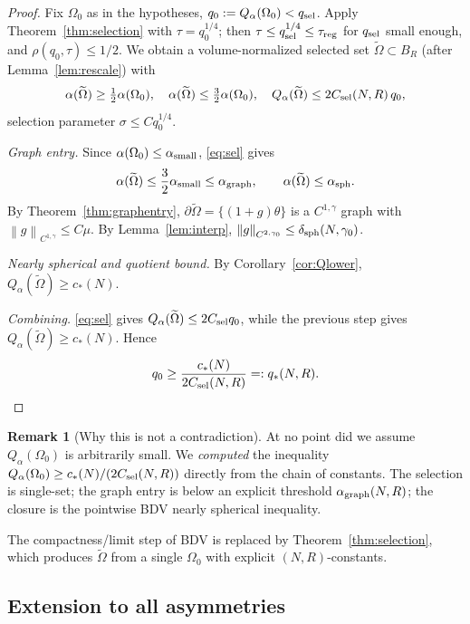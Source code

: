 \documentclass[11pt]{article}
\theoremstyle{definition}
\newtheorem{remark}[theorem]{Remark}
\newcommand{\norm}[1]{\left\|#1\right\|}
\begin{document}
\begin{proof}
Fix $\Omega_0$ as in the hypotheses, $q_0:=Q_\alpha(\Omega_0)<q_{\rm sel}$.
Apply Theorem~\ref{thm:selection} with $\tau=q_0^{1/4}$; then
$\tau\le q_{\rm sel}^{1/4}\le\tau_{\rm reg}$ for $q_{\rm sel}$ small enough,
and $\rho(q_0,\tau)\le1/2$. We obtain a volume-normalized selected set
$\widetilde\Omega\subset B_R$ (after Lemma~\ref{lem:rescale}) with
\begin{equation}\label{eq:sel}
\alpha(\widetilde\Omega)\ge\tfrac12\alpha(\Omega_0),
\quad
\alpha(\widetilde\Omega)\le\tfrac32\alpha(\Omega_0),
\quad
Q_\alpha(\widetilde\Omega)\le 2C_{\rm sel}(N,R)\,q_0,
\end{equation}
selection parameter $\sigma\le Cq_0^{1/4}$.

\emph{Graph entry.} Since $\alpha(\Omega_0)\le\alpha_{\rm small}$,
\eqref{eq:sel} gives
\[
\alpha(\widetilde\Omega)\le \frac32\alpha_{\rm small}
\le \alpha_{\rm graph},\qquad
\alpha(\widetilde\Omega)\le\alpha_{\rm sph}.
\]
By Theorem~\ref{thm:graphentry},
$\partial\widetilde\Omega=\{(1+g)\theta\}$ is a $C^{1,\gamma}$ graph with
$\norm{g}_{C^{1,\gamma}}\le C\mu$. By Lemma~\ref{lem:interp},
$\norm{g}_{C^{2,\gamma_0}}\le\delta_{\rm sph}(N,\gamma_0)$.

\emph{Nearly spherical and quotient bound.} By
Corollary~\ref{cor:Qlower}, $Q_\alpha(\widetilde\Omega)\ge c_*(N)$.

\emph{Combining.} \eqref{eq:sel} gives
$Q_\alpha(\widetilde\Omega)\le 2C_{\rm sel}q_0$, while the previous step gives
$Q_\alpha(\widetilde\Omega)\ge c_*(N)$. Hence
\[
q_0\ge\frac{c_*(N)}{2C_{\rm sel}(N,R)}=:q_*(N,R).
\]
\end{proof}

\begin{remark}[Why this is not a contradiction]
At no point did we assume $Q_\alpha(\Omega_0)$ is arbitrarily small. We
\emph{computed} the inequality
$Q_\alpha(\Omega_0)\ge c_*(N)/(2C_{\rm sel}(N,R))$
directly from the chain of constants. The selection is single-set; the
graph entry is below an explicit threshold $\alpha_{\rm graph}(N,R)$; the
closure is the pointwise BDV nearly spherical inequality.

The compactness/limit step of BDV is replaced by Theorem~\ref{thm:selection},
which produces $\widetilde\Omega$ from a single $\Omega_0$ with explicit
$(N,R)$-constants.
\end{remark}

\subsection{Extension to all asymmetries}
\end{document}
